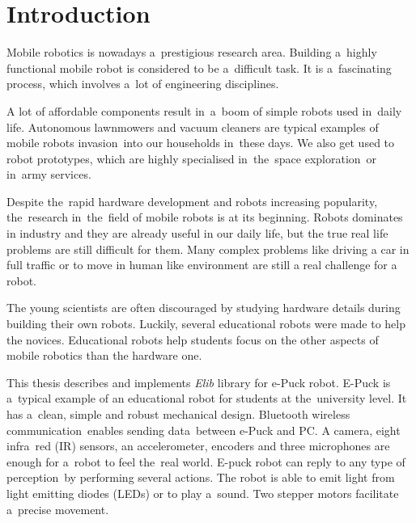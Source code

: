 \chapter{Introduction}
\label{chap:intro}
  Mobile robotics is nowadays a~prestigious research area. Building a~highly functional 
  mobile robot is considered to be a~difficult task. 
  It is a~fascinating process, which
  involves a~lot of engineering disciplines.
  
  A lot of affordable components result in~a~boom of simple robots used in~daily life. 
  Autonomous lawnmowers and vacuum cleaners are typical examples of mobile robots invasion~into our households in~these days.
  We also get used to robot prototypes, which are highly specialised in~the~space exploration~or in~army services.

  Despite the~rapid hardware development and robots increasing popularity,
  the~research in~the~field of mobile robots is at its beginning.
  Robots dominates in industry and they are already useful in our daily
  life, but the true real life problems are still difficult for them.
  Many complex problems like driving a car in full traffic or to move in human
  like environment are still a real challenge for a robot.
   
  The young scientists are often discouraged by
  studying hardware details during building their own robots.
  Luckily, several educational robots were made to help the novices.
  Educational robots help students focus on the other aspects of mobile robotics than the hardware one.
 
  This thesis describes and implements {\it Elib} library for e-Puck robot.
  E-Puck is a~typical example of an educational robot for students at the~university level. 
  It has a~clean, simple and robust mechanical design.
  Bluetooth wireless communication~enables sending data~between e-Puck and PC.
  A camera, eight infra~red (IR) sensors,	an accelerometer, encoders and three microphones 
  are enough for a~robot to feel the~real world.
  E-puck robot can reply to any type of perception~by performing several actions. 
  The robot is able to emit light from light emitting diodes (LEDs) or to play a~sound.
  Two stepper motors facilitate a~precise movement. 
  
  
